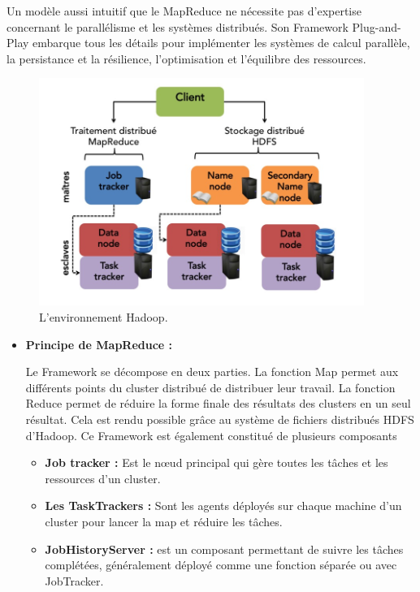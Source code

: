\begin{enumerate}
Un modèle aussi intuitif que le MapReduce ne nécessite pas d'expertise concernant le parallélisme et les systèmes distribués. Son Framework Plug-and-Play embarque tous les détails pour implémenter les systèmes de calcul parallèle, la persistance et la résilience, l'optimisation et l'équilibre des ressources.

\begin{figure}[h]
 \centering
 \includegraphics[scale=1]{img/fig7_}
 \caption{L'environnement Hadoop.}
\end{figure}

\begin{itemize}
\item \textbf{Principe de MapReduce :}

Le Framework se décompose en deux parties. La fonction Map permet aux différents points du cluster distribué de distribuer leur travail. La fonction Reduce permet de réduire la forme finale des résultats des clusters en un seul résultat. Cela est rendu possible grâce au système de fichiers distribués HDFS d'Hadoop. Ce Framework est également constitué de plusieurs composants 

\begin{itemize}\renewcommand{\labelitemi}{$\bullet$}
\item \textbf{Job tracker :} Est le nœud principal qui gère toutes les tâches et les ressources d'un cluster.
\item \textbf{Les TaskTrackers :} Sont les agents déployés sur chaque machine d'un cluster pour lancer la map et réduire les tâches.
\item \textbf{JobHistoryServer :} est un composant permettant de suivre les tâches complétées, généralement déployé comme une fonction séparée ou avec JobTracker.
\end{itemize}


\end{itemize}
\end{enumerate}
